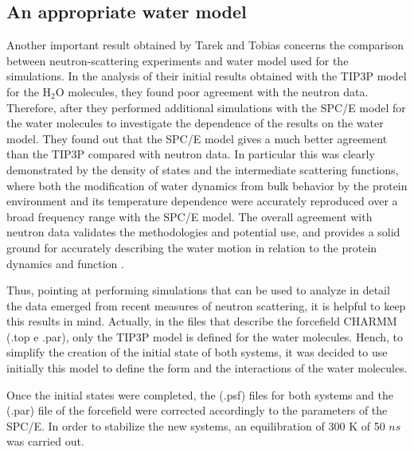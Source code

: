 \subsection{An appropriate water model}
Another important result obtained by Tarek and Tobias concerns the comparison between neutron-scattering experiments and water model used for the simulations. In the analysis of their initial results obtained with the TIP3P model \cite{jorgensen1983comparison} for the H$_2$O molecules, they found poor agreement with the neutron data. Therefore, after they performed additional simulations with the SPC/E \cite{berendsen1987missing} model for the water molecules to investigate the dependence of the results on the water model. They found out that the SPC/E model gives a much better agreement than the TIP3P compared with neutron data. 
In particular this was clearly demonstrated by the density of states and the intermediate scattering functions, where both the modification of water dynamics from bulk behavior by the protein environment and its temperature dependence were accurately reproduced over a broad frequency range with the SPC/E model. The overall agreement with neutron data validates the methodologies and potential use, and provides a solid ground for accurately describing the water motion in relation to the protein dynamics and function \cite{tarek2000dynamics}.

Thus, pointing at performing simulations that can be used to analyze in detail the data emerged from recent measures of neutron scattering, it is helpful to keep this results in mind. Actually, in the files that describe the forcefield CHARMM (.top e .par), only the TIP3P model is defined for the water molecules. Hench, to simplify the creation of the initial state of both systems, it was decided to use initially this model to define the form and the interactions of the water molecules.

Once the initial states were completed, the (.psf) files for both systems and the (.par) file of the forcefield were corrected accordingly to the parameters of the SPC/E. In order to stabilize the new systems, an equilibration of 300 K of 50 $ns$ was carried out.

